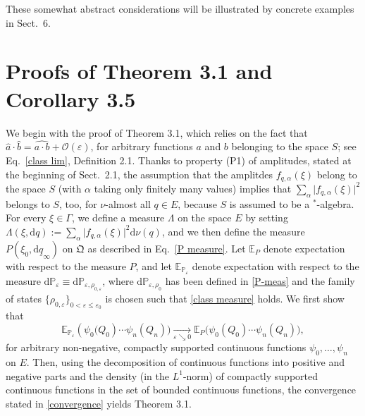 \documentclass[11pt]{article}
\begin{document}
\vspace{0.2cm}These somewhat abstract considerations will be illustrated by concrete examples in Sect.~6.

\section{Proofs of Theorem 3.1 and Corollary 3.5}
We begin with the proof of Theorem 3.1, which relies on the fact that 
$\widehat{a}\cdot \widehat{b}= \widehat{a\cdot b} + \mathcal{O}(\varepsilon)$, for arbitrary functions $a$ and $b$ 
belonging to the space $S$; see Eq.~\eqref{class lim}, Definition 2.1. Thanks to property (P1) of amplitudes, stated at the beginning 
of Sect.~2.1, the assumption that the amplitdes $f_{q, \alpha}(\xi)$ belong to the space $S$ (with $\alpha$ taking only 
finitely many values) implies that $\sum_{\alpha} \vert f_{q,\alpha}(\xi)\vert^{2}$ belongs to $S$, too, for $\nu$-almost 
all $q\in E$, because $S$ is assumed to be a $^{*}$-algebra. For every $\xi \in \Gamma$, we define a measure 
$\Lambda$ on the space $E$ by setting
$\Lambda(\xi, \text{d}q):= \sum_{\alpha} \vert f_{q,\alpha}(\xi)\vert^{2} \text{d}\nu(q)$, and we then define the
measure $P(\xi_0, \text{d}\underline{q}_{\infty})$ on $\mathfrak{Q}$ as described 
in Eq.~\eqref{P measure}.
Let $\mathbb{E}_{P}$ denote expectation with respect to the measure $P$, and let 
$\mathbb{E}_{\mathbb{P}_{\varepsilon}}$ denote expectation with respect to the measure 
$\text{d}\mathbb{P}_{\varepsilon}\equiv \text{d}\mathbb{P}_{\varepsilon, \rho_{0, \varepsilon}}$, where 
$\text{d}\mathbb{P}_{\varepsilon, \rho_{0}}$ has been defined in \eqref{P-meas} and the family of states 
$\big\{\rho_{0, \varepsilon}\big\}_{0<\varepsilon \leq \varepsilon_0}$ is chosen such that \eqref{class measure} holds.
We first show that
\begin{equation}\label{convergence}
\mathbb{E}_{\mathbb{P}_{\varepsilon}}(\psi_{0}\big(Q_0) \cdots \psi_{n}(Q_n)\big) 
\underset{\varepsilon \searrow 0}{\rightarrow} \mathbb{E}_{P}\big(\psi_{0}(Q_0) \cdots \psi_{n}(Q_n)\big),
\end{equation}
for arbitrary non-negative, compactly supported continuous functions $\psi_0, \dots, \psi_n$ on $E$. Then, using 
the decomposition of continuous functions into positive and negative parts and the density (in the $L^1$-norm) 
of compactly supported continuous functions in the set of bounded continuous functions, the convergence 
stated in \eqref{convergence} yields Theorem 3.1.
\end{document}
